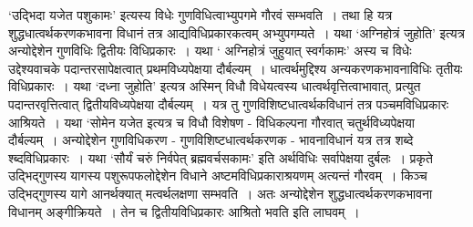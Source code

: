 {‘उद्भिदा यजेत पशुकामः’ इत्यस्य विधेः गुणविधित्वाभ्युपगमे गौरवं सम्भवति~। तथा हि यत्र शुद्धधात्वर्थकरणकभावना विधानं तत्र आद्यविधिप्रकारकत्वम् अभ्युपगम्यते~। यथा ‘अग्निहोत्रं जुहोति’ इत्यत्र अन्योद्देशेन गुणविधिः द्वितीयः विधिप्रकारः~। यथा ‘ अग्निहोत्रं जुहुयात् स्वर्गकामः’ अस्य च विधेः उद्देश्यवाचके पदान्तरसापेक्षत्वात् प्रथमविध्यपेक्षया दौर्बल्यम्~। धात्वर्थमुद्दिश्य अन्यकरणकभावनाविधिः तृतीयः विधिप्रकारः~। यथा ‘दध्ना जुहोति’ इत्यत्र अस्मिन् विधौ विधेयत्वस्य धात्वर्थवृत्तित्वाभावात्, प्रत्युत पदान्तरवृत्तित्वात् द्वितीयविध्यपेक्षया दौर्बल्यम्~। यत्र तु गुणविशिष्टधात्वर्थकविधानं तत्र पञ्चमविधिप्रकारः आश्रियते~। यथा ‘सोमेन यजेत इत्यत्र च विधौ विशेषण - विधिकल्पना गौरवात् चतुर्थविध्यपेक्षया दौर्बल्यम्~। अन्योद्देशेन गुणविधिकरण - गुणविशिष्टधात्वर्थकरणक - भावनाविधानं यत्र तत्र शब्दे श्ब्दविधिप्रकारः~। यथा ‘सौर्यं चरुं निर्वपेत् ब्रह्मवर्चसकामः’ इति अर्थविधिः सर्वापेक्षया दुर्बलः~। प्रकृते उद्भिद्गुणस्य यागस्य पशुरूपफलोद्देशेन विधाने अष्टमविधिप्रकाराश्रयणम् अत्यन्तं गौरवम्~। किञ्च उद्भिद्गुणस्य यागे आनर्थक्यात् मत्वर्थलक्षणा सम्भवति~। अतः अन्योद्देशेन शुद्धधात्वर्थकरणकभावना विधानम् अङ्गीक्रियते~। तेन च द्वितीयविधिप्रकारः आश्रितो भवति इति लाघवम्~। 

\articleend
}
